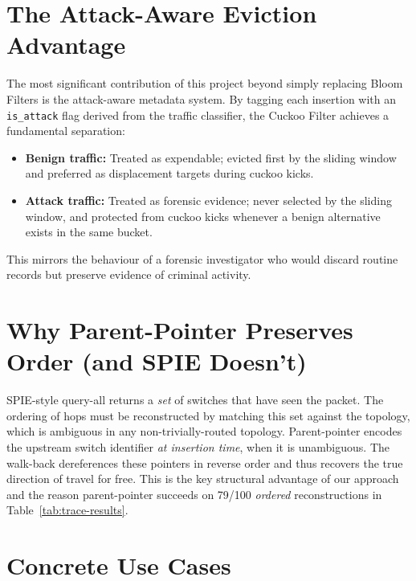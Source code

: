 \documentclass[12pt, a4paper]{report}
\begin{document}
\section{The Attack-Aware Eviction Advantage}

The most significant contribution of this project beyond simply
replacing Bloom Filters is the attack-aware metadata system. By tagging
each insertion with an \texttt{is\_attack} flag derived from the
traffic classifier, the Cuckoo Filter achieves a fundamental separation:

\begin{itemize}[leftmargin=*]
  \item \textbf{Benign traffic:} Treated as expendable; evicted first by
  the sliding window and preferred as displacement targets during cuckoo
  kicks.
  \item \textbf{Attack traffic:} Treated as forensic evidence; never
  selected by the sliding window, and protected from cuckoo kicks
  whenever a benign alternative exists in the same bucket.
\end{itemize}

This mirrors the behaviour of a forensic investigator who would discard
routine records but preserve evidence of criminal activity.

\section{Why Parent-Pointer Preserves Order (and SPIE Doesn't)}

SPIE-style query-all returns a \textit{set} of switches that have seen
the packet. The ordering of hops must be reconstructed by matching this
set against the topology, which is ambiguous in any non-trivially-routed
topology. Parent-pointer encodes the upstream switch identifier
\textit{at insertion time}, when it is unambiguous. The walk-back
dereferences these pointers in reverse order and thus recovers the true
direction of travel for free. This is the key structural advantage of
our approach and the reason parent-pointer succeeds on 79/100
\textit{ordered} reconstructions in Table~\ref{tab:trace-results}.

\section{Concrete Use Cases}
\end{document}
